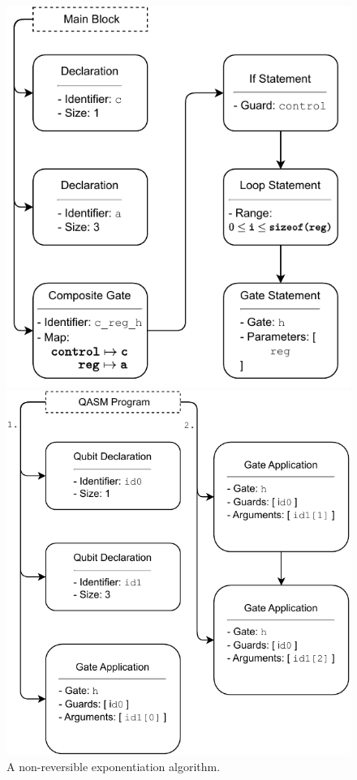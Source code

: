 \begin{figure}
    \centering     
    \begin{minipage}{.45\textwidth}
        \includegraphics[width=\textwidth]{../figures/codeGen_sourceCode_example.pdf}
        \caption{A non-reversible exponentiation algorithm.}
        \label{fig:codeGen_sourceCodeRep_example}
    \end{minipage}
    \hfill
    \begin{minipage}{.45\textwidth}
        \includegraphics[width=\textwidth]{../figures/codeGen_targetCode_example.pdf}

\end{minipage}
\end{figure}
